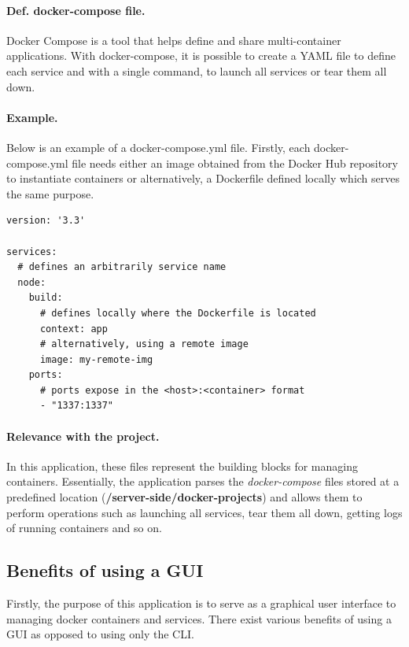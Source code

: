 \documentclass[multi, tikz, a4paper, oneside]{article}
\begin{document}
\paragraph{Def. docker-compose file.}
Docker Compose is a tool that helps define and share multi-container
applications. With docker-compose, it is possible to create a YAML file to
define each service and with a single command, to launch all services or tear
them all down.

\paragraph{Example.}
Below is an example of a docker-compose.yml file. Firstly, each
docker-compose.yml file needs either an image obtained from the Docker Hub
repository to instantiate containers or alternatively, a Dockerfile defined
locally which serves the same purpose.

\begin{lstlisting}[language=docker-compose-2,caption={Sample docker-compose file},breaklines=true,label={code:compose}]
version: '3.3'

services:
  # defines an arbitrarily service name
  node:
    build:
      # defines locally where the Dockerfile is located
      context: app
      # alternatively, using a remote image
      image: my-remote-img
    ports:
      # ports expose in the <host>:<container> format
      - "1337:1337"
\end{lstlisting}

\paragraph{Relevance with the project.}
In this application, these files represent the building blocks for managing
containers. Essentially, the application parses the {\em{docker-compose}} files
stored at a predefined location ({\textbf{/server-side/docker-projects}}) and
allows them to perform operations such as launching all services, tear them all
down, getting logs of running containers and so on.


\subsection{Benefits of using a GUI}
Firstly, the purpose of this application is to serve as a graphical user
interface to managing docker containers and services. There exist various
benefits of using a GUI as opposed to using only the CLI.
\end{document}
